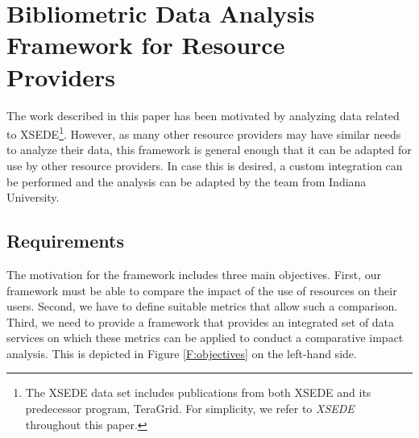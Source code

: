 \documentclass[10pt, conference, compsocconf]{IEEEtran}
\begin{document}
\section{Bibliometric Data Analysis \\Framework for Resource
  \\Providers} \label{S:framework}

The work described in this paper has been motivated by analyzing data related to XSEDE\footnote{The XSEDE data set includes publications from both XSEDE and its predecessor program, TeraGrid. For simplicity, we refer to {\em XSEDE} throughout this paper.}. However, as many other resource providers may have similar needs to analyze their data, this framework is general enough that it can be adapted for use by other resource providers. In case this is desired, a custom integration can be performed and the analysis can be adapted by the team from Indiana University. 


\subsection{Requirements}

The motivation for the framework includes three main objectives.  First, our framework must be able to compare the impact of the use of resources on their users. Second, we have to define suitable metrics that allow such a comparison. Third, we need to provide a framework that provides an integrated set of data services on which these metrics can be applied to conduct a comparative impact analysis. This is depicted in Figure \ref{F:objectives} on the left-hand side.
\end{document}
